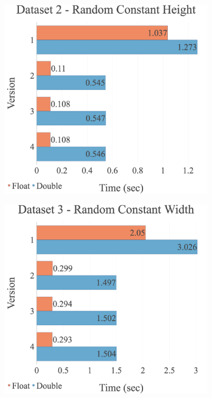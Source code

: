 \begin{figure}[H]
\begin{adjustwidth}{-2cm}{-2cm}
\begin{subfigure}{.62\textwidth}
\end{subfigure}
\par\bigskip
\par\bigskip
\begin{subfigure}{.62\textwidth}
  \centering
  \includegraphics[width=1\textwidth]{img/experiments/option-versions-2_RANDCONSTHEIGHT.png}
\end{subfigure}
\begin{subfigure}{.62\textwidth}
  \centering
  \includegraphics[width=1\textwidth]{img/experiments/option-versions-3_RANDCONSTWIDTH.png}
\end{subfigure}
\end{adjustwidth}
\end{figure}


